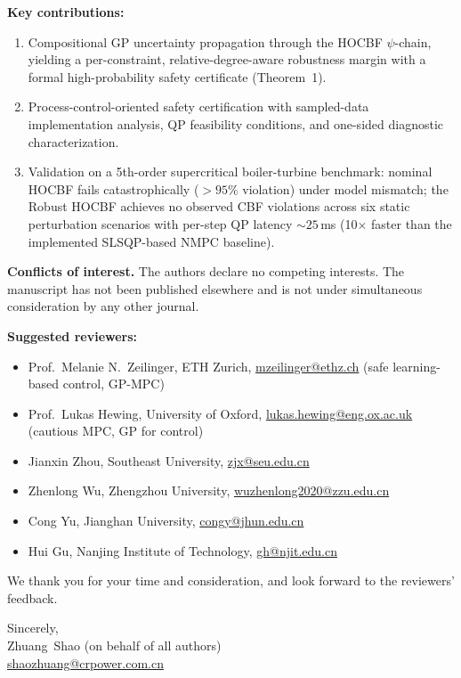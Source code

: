 \documentclass[11pt,a4paper]{article}
\begin{document}
\textbf{Key contributions:}
\begin{enumerate}
  \item Compositional GP uncertainty propagation through the HOCBF $\psi$-chain, yielding a per-constraint, relative-degree-aware robustness margin with a formal high-probability safety certificate (Theorem~1).
  \item Process-control-oriented safety certification with sampled-data implementation analysis, QP feasibility conditions, and one-sided diagnostic characterization.
  \item Validation on a 5th-order supercritical boiler-turbine benchmark: nominal HOCBF fails catastrophically ($>95\%$ violation) under model mismatch; the Robust HOCBF achieves no observed CBF violations across six static perturbation scenarios with per-step QP latency ${\sim}25$\,ms (10$\times$ faster than the implemented SLSQP-based NMPC baseline).
\end{enumerate}

\textbf{Conflicts of interest.} The authors declare no competing interests. The manuscript has not been published elsewhere and is not under simultaneous consideration by any other journal.

\textbf{Suggested reviewers:}
\begin{itemize}
  \item Prof.\ Melanie N.\ Zeilinger, ETH Zurich, \href{mailto:mzeilinger@ethz.ch}{mzeilinger@ethz.ch} (safe learning-based control, GP-MPC)
  \item Prof.\ Lukas Hewing, University of Oxford, \href{mailto:lukas.hewing@eng.ox.ac.uk}{lukas.hewing@eng.ox.ac.uk} (cautious MPC, GP for control)
  \item Jianxin Zhou, Southeast University, \href{mailto:zjx@seu.edu.cn}{zjx@seu.edu.cn}
  \item Zhenlong Wu, Zhengzhou University, \href{mailto:wuzhenlong2020@zzu.edu.cn}{wuzhenlong2020@zzu.edu.cn}
  \item Cong Yu, Jianghan University, \href{mailto:congy@jhun.edu.cn}{congy@jhun.edu.cn}
  \item Hui Gu, Nanjing Institute of Technology, \href{mailto:gh@njit.edu.cn}{gh@njit.edu.cn}
\end{itemize}

\vspace{1em}
\noindent We thank you for your time and consideration, and look forward to the reviewers' feedback.

\vspace{1em}
\begin{flushright}
Sincerely,\\[1em]
Zhuang~Shao (on behalf of all authors)\\
\href{mailto:shaozhuang@crpower.com.cn}{shaozhuang@crpower.com.cn}
\end{flushright}
\end{document}

